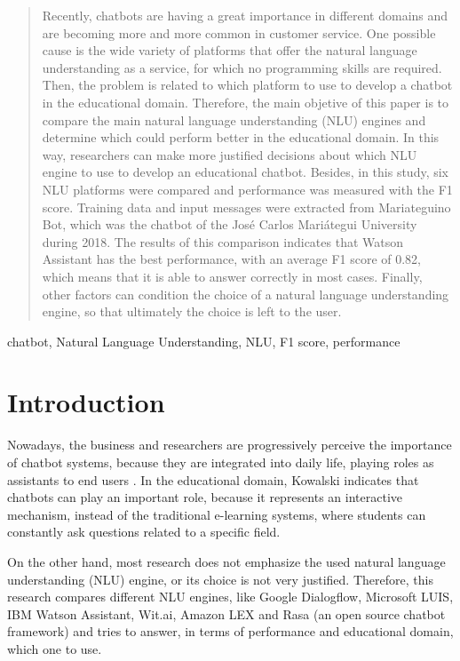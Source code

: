\documentclass[conference, letterpaper]{IEEEtran}
\begin{document}
\begin{abstract}
  Recently, chatbots are having a great importance in different domains and are becoming more and more common in customer service. One possible cause is the wide variety of platforms that offer the natural language understanding as a service, for which no programming skills are required. Then, the problem is related to which platform to use to develop a chatbot in the educational domain. Therefore, the main objetive of this paper is to compare the main natural language understanding (NLU) engines and determine which could perform better in the educational domain. In this way, researchers can make more justified decisions about which NLU engine to use to develop an educational chatbot. Besides, in this study, six NLU platforms were compared and performance was measured with the F1 score. Training data and input messages were extracted from Mariateguino Bot, which was the chatbot of the José Carlos Mariátegui University during 2018. The results of this comparison indicates that Watson Assistant has the best performance, with an average F1 score of 0.82, which means that it is able to answer correctly in most cases. Finally, other factors can condition the choice of a natural language understanding engine, so that ultimately the choice is left to the user.

\end{abstract}

\begin{IEEEkeywords}
  chatbot, Natural Language Understanding, NLU, F1 score, performance
\end{IEEEkeywords}

\IEEEpeerreviewmaketitle



\section{Introduction}
Nowadays, the business and researchers are progressively perceive the importance of chatbot systems, because they are integrated into daily life, playing roles as assistants to end users \cite{Bird2018}. In the educational domain, Kowalski  \cite{Kowalski2011} indicates that chatbots can play an important role, because it represents an interactive mechanism, instead of the traditional e-learning systems, where students can constantly ask questions related to a specific field.

On the other hand, most research does not emphasize the used natural language understanding (NLU) engine, or its choice is not very justified. Therefore, this research compares different NLU engines, like Google Dialogflow, Microsoft LUIS, IBM Watson Assistant, Wit.ai, Amazon LEX and Rasa (an open source chatbot framework) and tries to answer, in terms of performance and educational domain, which one to use.
\end{document}

